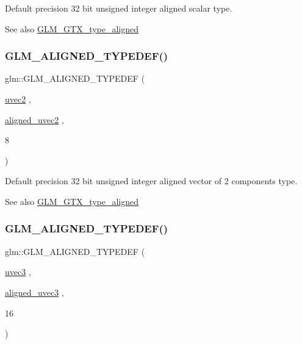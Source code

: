 Default precision 32 bit unsigned integer aligned scalar type. \begin{DoxySeeAlso}{See also}
\mbox{\hyperlink{group__gtx__type__aligned}{G\+L\+M\+\_\+\+G\+T\+X\+\_\+type\+\_\+aligned}} 
\end{DoxySeeAlso}
\mbox{\label{group__gtx__type__aligned_ga94e86186978c502c6dc0c0d9c4a30679}} 
\subsubsection{\texorpdfstring{GLM\_ALIGNED\_TYPEDEF()}{GLM\_ALIGNED\_TYPEDEF()}\hspace{0.1cm}{\footnotesize\ttfamily [118/209]}}
{\footnotesize\ttfamily glm\+::\+G\+L\+M\+\_\+\+A\+L\+I\+G\+N\+E\+D\+\_\+\+T\+Y\+P\+E\+D\+EF (\begin{DoxyParamCaption}\item[{\mbox{\hyperlink{group__core__types_gafd2041b45eff671aa8899d2c2835eee9}{uvec2}}}]{,  }\item[{\mbox{\hyperlink{group__gtc__type__aligned_gacddd39189c2dedf7dd48c02155279124}{aligned\+\_\+uvec2}}}]{,  }\item[{8}]{ }\end{DoxyParamCaption})}

Default precision 32 bit unsigned integer aligned vector of 2 components type. \begin{DoxySeeAlso}{See also}
\mbox{\hyperlink{group__gtx__type__aligned}{G\+L\+M\+\_\+\+G\+T\+X\+\_\+type\+\_\+aligned}} 
\end{DoxySeeAlso}
\mbox{\label{group__gtx__type__aligned_ga5cec574686a7f3c8ed24bb195c5e2d0a}} 
\subsubsection{\texorpdfstring{GLM\_ALIGNED\_TYPEDEF()}{GLM\_ALIGNED\_TYPEDEF()}\hspace{0.1cm}{\footnotesize\ttfamily [119/209]}}
{\footnotesize\ttfamily glm\+::\+G\+L\+M\+\_\+\+A\+L\+I\+G\+N\+E\+D\+\_\+\+T\+Y\+P\+E\+D\+EF (\begin{DoxyParamCaption}\item[{\mbox{\hyperlink{group__core__types_gac4ba593917841b859ba1683b8b52b8fa}{uvec3}}}]{,  }\item[{\mbox{\hyperlink{group__gtc__type__aligned_ga5dee635ca69be0f5de5630a59d89034f}{aligned\+\_\+uvec3}}}]{,  }\item[{16}]{ }\end{DoxyParamCaption})}

